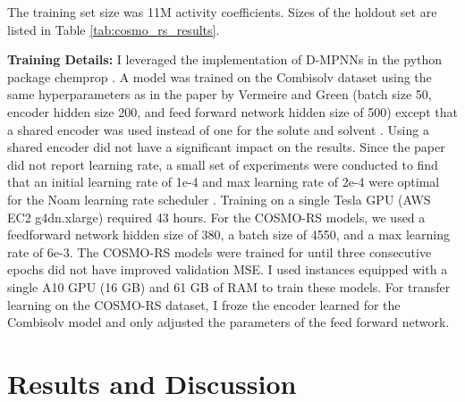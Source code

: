 The training set size was 11M activity coefficients. Sizes of the holdout set are listed in Table \ref{tab:cosmo_rs_results}.

\noindent
\textbf{Training Details:} I leveraged the implementation of D-MPNNs in the python package chemprop \cite{Yang2019, Heid2023a}. A model was trained on the Combisolv dataset using the same hyperparameters as in the paper by Vermeire and Green (batch size 50, encoder hidden size 200, and feed forward network hidden size of 500) except that a shared encoder was used instead of one for the solute and solvent \cite{Vermeire2021}. Using a shared encoder did not have a significant impact on the results. Since the paper did not report learning rate, a small set of experiments were conducted to find that an initial learning rate of 1e-4 and max learning rate of 2e-4 were optimal for the Noam learning rate scheduler \cite{Vaswani2017}. Training on a single Tesla GPU (AWS EC2 g4dn.xlarge) required 43 hours. For the COSMO-RS models, we used a feedforward network hidden size of 380, a batch size of 4550, and a max learning rate of 6e-3.  The COSMO-RS models were trained for until three consecutive epochs did not have improved validation MSE. I used instances equipped with a single A10 GPU (16 GB) and 61 GB of RAM to train these models. For transfer learning on the COSMO-RS dataset, I froze the encoder learned for the Combisolv model and only adjusted the parameters of the feed forward network.


\section{Results and Discussion}

